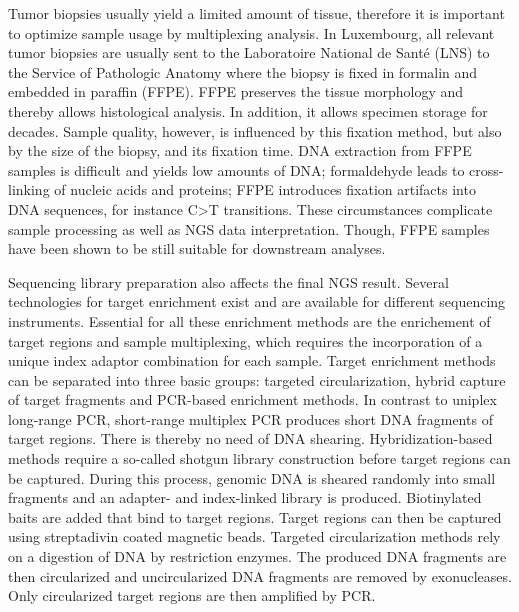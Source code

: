{{      Tumor biopsies usually yield a limited amount of tissue, therefore it is
      important to optimize sample usage by multiplexing analysis. In
      Luxembourg, all relevant tumor biopsies are usually sent to the
      Laboratoire National de Santé (LNS) to the Service of Pathologic Anatomy
      where the biopsy is fixed in formalin and embedded in paraffin (FFPE).
      FFPE preserves the tissue morphology and thereby allows histological
      analysis. In addition, it allows specimen storage for decades. Sample
      quality, however, is influenced by this fixation method, but also by the
      size of the biopsy, and its fixation time. DNA extraction from FFPE
      samples is difficult and yields low amounts of DNA; formaldehyde
      leads to cross-linking of nucleic acids and proteins; FFPE introduces
      fixation artifacts into DNA sequences, for instance C>T transitions.
      These circumstances complicate sample processing as well as NGS data
      interpretation. Though, FFPE samples have been shown to be still suitable
      for downstream analyses.

      Sequencing library preparation also affects the final NGS result. Several
      technologies for target enrichment exist and are available for different
      sequencing instruments. Essential for all these enrichment methods
      are the enrichement of target regions and sample multiplexing, which
      requires the incorporation of a unique index adaptor combination for each
      sample. Target enrichment methods can be separated into three basic
      groups: targeted circularization, hybrid capture of target fragments and
      PCR-based enrichment methods. In contrast to uniplex long-range PCR,
      short-range multiplex PCR produces short DNA fragments of target regions.
      There is thereby no need of DNA shearing. Hybridization-based methods
      require a so-called shotgun library construction before target regions can
      be captured. During this process, genomic DNA is sheared randomly into
      small fragments and an adapter- and index-linked library is produced.
      Biotinylated baits are added that bind to target regions. Target regions
      can then be captured using streptadivin coated magnetic beads. Targeted
      circularization methods rely on a digestion of DNA by restriction enzymes.
      The produced DNA fragments are then circularized and uncircularized DNA
      fragments are removed by exonucleases. Only circularized target regions
      are then amplified by PCR.

}}
